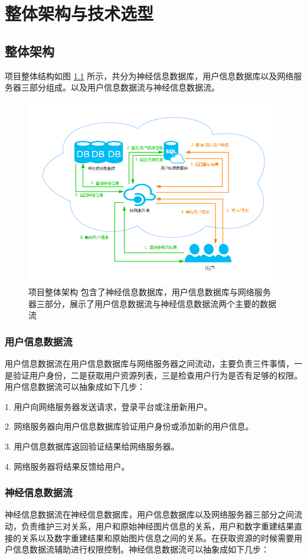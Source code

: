 \chapter{整体架构与技术选型}

\section{整体架构}
项目整体结构如图 \ref{server} 所示，共分为神经信息数据库，用户信息数据库以及网络服务器三部分组成。以及用户信息数据流与神经信息数据流。

\begin{figure}[!ht]
\centering
\includegraphics[width=128mm]{images/server}
\caption{项目整体架构 包含了神经信息数据库，用户信息数据库与网络服务器三部分，展示了用户信息数据流与神经信息数据流两个主要的数据流}
\label{server}
\end{figure}

\subsection{用户信息数据流}
用户信息数据流在用户信息数据库与网络服务器之间流动，主要负责三件事情，一是验证用户身份，二是获取用户资源列表，三是检查用户行为是否有足够的权限。用户信息数据流可以抽象成如下几步：

1. 用户向网络服务器发送请求，登录平台或注册新用户。

2. 网络服务器向用户信息数据库验证用户身份或添加新的用户信息。

3. 用户信息数据库返回验证结果给网络服务器。

4. 网络服务器将结果反馈给用户。

\subsection{神经信息数据流}
神经信息数据流在神经信息数据库，用户信息数据库以及网络服务器三部分之间流动，负责维护三对关系，用户和原始神经图片信息的关系，用户和数字重建结果直接的关系以及数字重建结果和原始图片信息之间的关系。在获取资源的时候需要用户信息数据流辅助进行权限控制。神经信息数据流可以抽象成如下几步：

